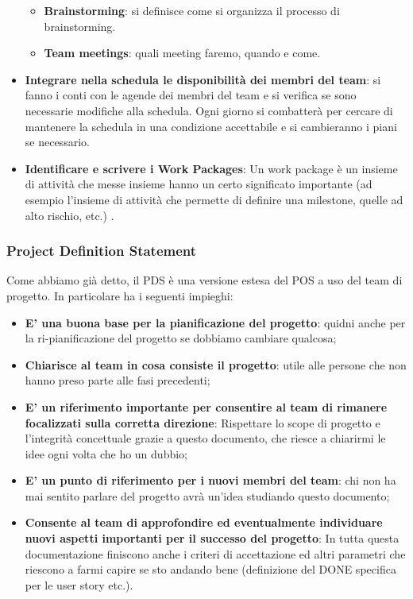 \begin{itemize}
\begin{itemize}
		\item \textbf{Brainstorming}: si definisce come si organizza il processo di brainstorming.
		\item \textbf{Team meetings}: quali meeting faremo, quando e come.
	\end{itemize}
	\item \textbf{Integrare nella schedula le disponibilità dei membri del team}: si fanno i conti con le agende dei membri del team e si verifica se sono necessarie modifiche alla schedula. Ogni giorno si combatterà per cercare di mantenere la schedula in una condizione accettabile e si cambieranno i piani se necessario.
	\item \textbf{Identificare e scrivere i Work Packages}: Un work package è un insieme di attività che messe insieme hanno un certo significato importante (ad esempio l'insieme di attività che permette di definire una milestone, quelle ad alto rischio, etc.) .
\end{itemize}

\subsubsection{Project Definition Statement}
Come abbiamo già detto, il PDS è una versione estesa del POS a uso del team di progetto. In particolare ha i seguenti impieghi:
\begin{itemize}
	\item \textbf{E’ una buona base per la pianificazione del progetto}: quidni anche per la ri-pianificazione del progetto se dobbiamo cambiare qualcosa;
	\item \textbf{Chiarisce al team in cosa consiste il progetto}: utile alle persone che non hanno preso parte alle fasi precedenti;
	\item \textbf{E’ un riferimento importante per consentire al team di rimanere focalizzati sulla corretta direzione}: Rispettare lo scope di progetto e l'integrità concettuale grazie a questo documento, che riesce a chiarirmi le idee ogni volta che ho un dubbio;
	\item \textbf{E’ un punto di riferimento per i nuovi membri del team}: chi non ha mai sentito parlare del progetto avrà un'idea studiando questo documento;
	\item \textbf{Consente al team di approfondire ed eventualmente individuare nuovi aspetti importanti per il successo del progetto}: In tutta questa documentazione finiscono anche i criteri di accettazione ed altri parametri che riescono a farmi capire se sto andando bene (definizione del DONE specifica per le user story etc.).
\end{itemize}
